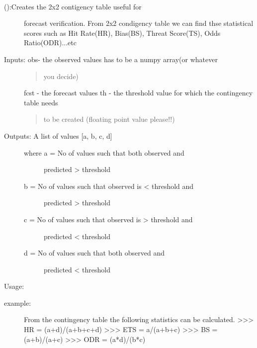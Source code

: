 \documentclass[letterpaper,10pt,english]{sphinxmanual}
\begin{document}
\begin{fulllineitems}
\label{diagnosis:ctgfunction.contingency_table_2x2}~\begin{description}
\item[{{\hyperref[diagnosis:ctgfunction.contingency_table_2x2]{}} ():Creates the 2x2 contigency table useful for}] \leavevmode
forecast verification. From 2x2 condigency table we can find thse
statistical scores such as Hit Rate(HR), Bias(BS),
Threat Score(TS), Odds Ratio(ODR)...etc

\item[{Inputs: obs- the observed values has to be a numpy array(or whatever}] \leavevmode\begin{quote}

you decide)
\end{quote}

fcst - the forecast values
th  - the threshold value for which the contingency table needs
\begin{quote}

to be created (floating point value please!!)
\end{quote}

\item[{Outputs: A list of values {[}a, b, c, d{]}}] \leavevmode\begin{description}
\item[{where a = No of values such that both observed and}] \leavevmode
predicted \textgreater{} threshold

\item[{b = No of values such that observed is \textless{} threshold and}] \leavevmode
predicted \textgreater{} threshold

\item[{c = No of values such that observed is \textgreater{} threshold and}] \leavevmode
predicted \textless{} threshold

\item[{d = No of values such that both observed and}] \leavevmode
predicted \textless{} threshold

\end{description}

\end{description}

Usage:
\begin{description}
\item[{example:}] \leavevmode
From the contingency table the following statistics can be
calculated.
\textgreater{}\textgreater{}\textgreater{} HR = (a+d)/(a+b+c+d)
\textgreater{}\textgreater{}\textgreater{} ETS = a/(a+b+c)
\textgreater{}\textgreater{}\textgreater{} BS = (a+b)/(a+c)
\textgreater{}\textgreater{}\textgreater{} ODR = (a*d)/(b*c)


\end{description}
\end{fulllineitems}
\end{document}
